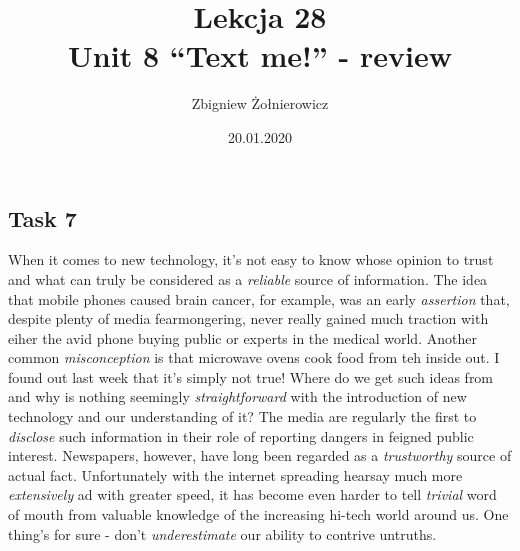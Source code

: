 \documentclass[a4paper]{article}
\begin{document}
\title{{\huge Lekcja 28} \\
{\large Unit 8 ``Text me!'' - review}}
\author{Zbigniew Żołnierowicz}
\date{20.01.2020}
\maketitle
\subsection{Task 7}
When it comes to new technology, it's not easy to know whose opinion to trust and what can truly be considered as a \emph{reliable} source of information.
The idea that mobile phones caused brain cancer, for example, was an early \emph{assertion} that, despite plenty of media fearmongering, never really gained much traction with eiher the avid phone buying public or experts in the medical world.
Another common \emph{misconception} is that microwave ovens cook food from teh inside out. I found out last week that it's simply not true!
Where do we get such ideas from and why is nothing seemingly \emph{straightforward} with the introduction of new technology and our understanding of it?
The media are regularly the first to \emph{disclose} such information in their role of reporting dangers in feigned public interest. Newspapers, however, have long been regarded as a \emph{trustworthy} source of actual fact.
Unfortunately with the internet spreading hearsay much more \emph{extensively} ad with greater speed, it has become even harder to tell \emph{trivial} word of mouth from valuable knowledge of the increasing hi-tech world around us.
One thing's for sure - don't \emph{underestimate} our ability to contrive untruths.
\end{document}
